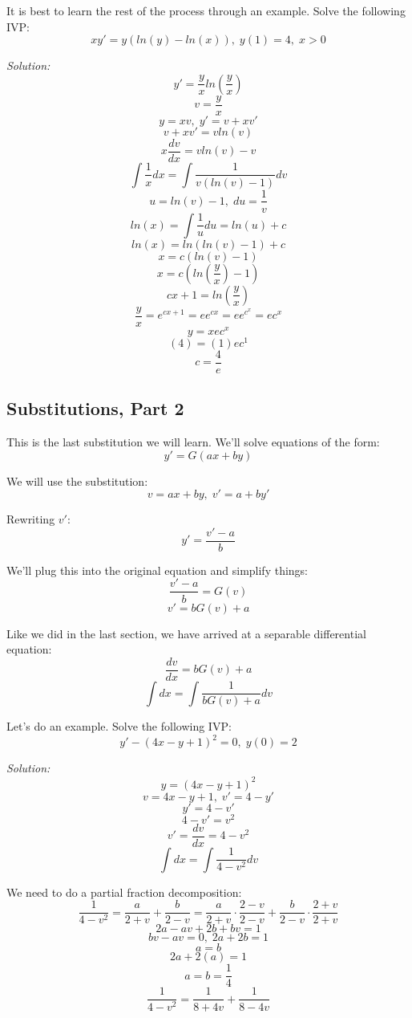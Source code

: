 	It is best to learn the rest of the process through an example. Solve the following IVP:
	$$xy' = y(ln(y) - ln(x)),\;y(1) = 4,\;x > 0$$
	
	\textit{Solution:}
	$$y' = \frac{y}{x}ln\left(\frac{y}{x}\right)$$
	$$v = \frac{y}{x}$$
	$$y = xv,\;y' = v + xv'$$
	$$v + xv' = vln(v)$$
	$$x\frac{dv}{dx} = vln(v) - v$$
	$$\int \frac{1}{x}dx = \int \frac{1}{v(ln(v) - 1)}dv$$
	$$u = ln(v) - 1,\;du = \frac{1}{v}$$
	$$ln(x) = \int \frac{1}{u}du = ln(u) + c$$
	$$ln(x) = ln(ln(v) - 1) + c$$
	$$x = c(ln(v) - 1)$$
	$$x = c\left(ln\left(\frac{y}{x}\right) - 1\right)$$
	$$cx + 1 = ln\left(\frac{y}{x}\right)$$
	$$\frac{y}{x} = e^{cx + 1} = ee^{cx} = ee^{c^{x}} = ec^{x}$$
	$$y = xec^{x}$$
	$$(4) = (1)ec^{1}$$
	$$c = \frac{4}{e}$$
	\begin{center}
	\end{center}
	
	\subsection{Substitutions, Part 2}
	This is the last substitution we will learn. We'll solve equations of the form:
	$$y' = G(ax + by)$$
	
	We will use the substitution:
	$$v = ax + by,\;v' = a + by'$$
	
	Rewriting $v'$:
	$$y' = \frac{v' - a}{b}$$
	
	We'll plug this into the original equation and simplify things:
	$$\frac{v' - a}{b} = G(v)$$
	$$v' = bG(v) + a$$
	
	Like we did in the last section, we have arrived at a separable differential equation:
	$$\frac{dv}{dx} = bG(v) + a$$
	$$\int dx = \int \frac{1}{bG(v) + a}dv$$
	
	Let's do an example. Solve the following IVP:
	$$y' - (4x - y + 1)^{2} = 0,\;y(0) = 2$$
	
	\textit{Solution:}
	$$y = (4x - y + 1)^{2}$$
	$$v = 4x - y + 1,\;v' = 4 - y'$$
	$$y' = 4 - v'$$
	$$4 - v' = v^{2}$$
	$$v' = \frac{dv}{dx} = 4 - v^{2}$$
	$$\int dx = \int \frac{1}{4 - v^{2}}dv$$
	
	We need to do a partial fraction decomposition:
	$$\frac{1}{4 - v^{2}} = \frac{a}{2 + v} + \frac{b}{2 - v} = \frac{a}{2 + v}\cdot\frac{2 - v}{2 - v} + \frac{b}{2 - v}\cdot\frac{2 + v}{2 + v}$$
	$$2a - av + 2b + bv = 1$$
	$$bv - av = 0,\;2a + 2b = 1$$
	$$a = b$$
	$$2a + 2(a) = 1$$
	$$a = b = \frac{1}{4}$$
	$$\frac{1}{4 - v^{2}} = \frac{1}{8 + 4v} + \frac{1}{8 - 4v}$$
	
